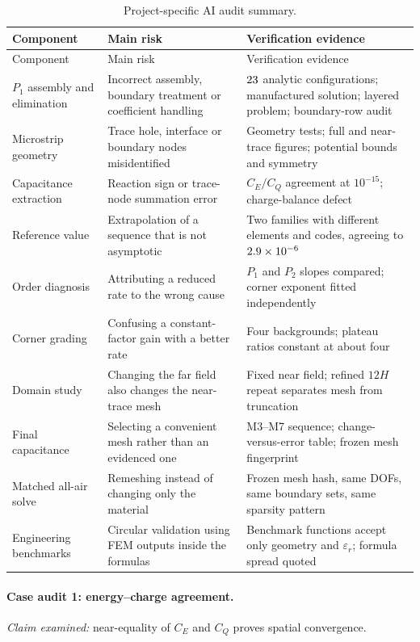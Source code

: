 \documentclass[11pt]{article}
\newcommand{\epsr}{\varepsilon_r}
\begin{document}
\begin{longtable}{@{}L{0.22\textwidth}L{0.32\textwidth}L{0.36\textwidth}@{}}
\caption{Project-specific AI audit summary.}\label{tab:aiaudit}\\
\toprule
Component & Main risk & Verification evidence\\
\midrule
\endfirsthead
\toprule
Component & Main risk & Verification evidence\\
\midrule
\endhead
$P_1$ assembly and elimination & Incorrect assembly, boundary treatment or coefficient handling & $23$ analytic configurations; manufactured solution; layered problem; boundary-row audit\\
Microstrip geometry & Trace hole, interface or boundary nodes misidentified & Geometry tests; full and near-trace figures; potential bounds and symmetry\\
Capacitance extraction & Reaction sign or trace-node summation error & $C_E/C_Q$ agreement at $10^{-15}$; charge-balance defect\\
Reference value & Extrapolation of a sequence that is not asymptotic & Two families with different elements and codes, agreeing to $2.9\times10^{-6}$\\
Order diagnosis & Attributing a reduced rate to the wrong cause & $P_1$ and $P_2$ slopes compared; corner exponent fitted independently\\
Corner grading & Confusing a constant-factor gain with a better rate & Four backgrounds; plateau ratios constant at about four\\
Domain study & Changing the far field also changes the near-trace mesh & Fixed near field; refined $12H$ repeat separates mesh from truncation\\
Final capacitance & Selecting a convenient mesh rather than an evidenced one & M3--M7 sequence; change-versus-error table; frozen mesh fingerprint\\
Matched all-air solve & Remeshing instead of changing only the material & Frozen mesh hash, same DOFs, same boundary sets, same sparsity pattern\\
Engineering benchmarks & Circular validation using FEM outputs inside the formulas & Benchmark functions accept only geometry and $\epsr$; formula spread quoted\\
\bottomrule
\end{longtable}

\paragraph{Case audit 1: energy--charge agreement.}
\noindent\textit{Claim examined:} near-equality of $C_E$ and $C_Q$ proves spatial
convergence.
\end{document}
